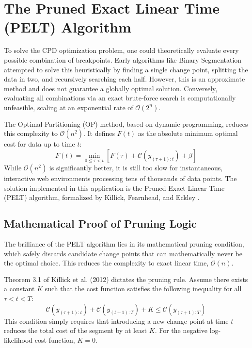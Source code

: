 \documentclass[11pt, a4paper]{report}
\begin{document}
\section{The Pruned Exact Linear Time (PELT) Algorithm}
To solve the CPD optimization problem, one could theoretically evaluate every possible combination of breakpoints. Early algorithms like Binary Segmentation attempted to solve this heuristically by finding a single change point, splitting the data in two, and recursively searching each half. However, this is an approximate method and does not guarantee a globally optimal solution. Conversely, evaluating all combinations via an exact brute-force search is computationally unfeasible, scaling at an exponential rate of $\mathcal{O}(2^n)$. 

The Optimal Partitioning (OP) method, based on dynamic programming, reduces this complexity to $\mathcal{O}(n^2)$. It defines $F(t)$ as the absolute minimum optimal cost for data up to time $t$:
\begin{equation}
    F(t) = \min_{0 \le \tau < t} \left[ F(\tau) + \mathcal{C}(y_{(\tau+1):t}) + \beta \right]
\end{equation}
While $\mathcal{O}(n^2)$ is significantly better, it is still too slow for instantaneous, interactive web environments processing tens of thousands of data points. The solution implemented in this application is the Pruned Exact Linear Time (PELT) algorithm, formalized by Killick, Fearnhead, and Eckley \cite{Killick2012}.

\subsection{Mathematical Proof of Pruning Logic}
The brilliance of the PELT algorithm lies in its mathematical pruning condition, which safely discards candidate change points that can mathematically never be the optimal choice. This reduces the complexity to exact linear time, $\mathcal{O}(n)$.

Theorem 3.1 of Killick et al. (2012) dictates the pruning rule. Assume there exists a constant $K$ such that the cost function satisfies the following inequality for all $\tau < t < T$:
\begin{equation}
    \mathcal{C}(y_{(\tau+1):t}) + \mathcal{C}(y_{(t+1):T}) + K \le \mathcal{C}(y_{(\tau+1):T})
\end{equation}
This condition simply requires that introducing a new change point at time $t$ reduces the total cost of the segment by at least $K$. For the negative log-likelihood cost function, $K=0$. 
\end{document}
